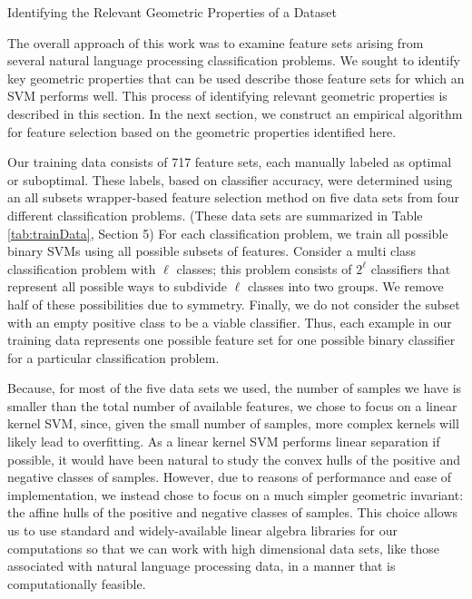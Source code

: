 \documentclass{llncs}
\begin{document}
\begin{section}{Identifying the Relevant Geometric Properties of a Dataset}

The overall approach of this work was to examine feature sets arising from  several natural language processing classification problems. We sought to identify key geometric properties that can be used describe those feature sets for which an SVM performs well. This process of identifying relevant geometric properties is described in this section. In the next section, we construct an empirical algorithm for feature selection based on the geometric properties identified here.

Our training data consists of 717 feature sets, each manually labeled as optimal or suboptimal. These labels, based on classifier accuracy, were determined using an all subsets wrapper-based feature selection method on five data sets from four different classification problems. (These data sets are summarized in Table \ref{tab:trainData}, Section 5) For each classification problem, we train all possible binary SVMs using all possible subsets of features. Consider a multi class classification problem with $\ell$ classes; this problem consists of $2^{\ell}$ classifiers that represent all possible ways to subdivide $\ell$ classes into two groups. We remove half of these possibilities due to symmetry. Finally, we do not consider the subset with an empty positive class to be a viable classifier. Thus, each example in our training data represents one possible feature set for one possible binary classifier for a particular classification problem.

Because, for most of the five data sets we used, the number of samples we have is smaller than the total number of available features, we chose to focus on a linear kernel SVM, since, given the small number of samples, more complex kernels will likely lead to overfitting. As a linear kernel SVM performs linear separation if possible, it would have been natural to study the convex hulls of the positive and negative classes of samples. However, due to reasons of performance and ease of implementation, we instead chose to focus on a much simpler geometric invariant: the affine hulls of the positive and negative classes of samples. This choice allows us to use standard and widely-available linear algebra libraries for our computations so that we can work with high dimensional data sets, like those associated with natural language processing data, in a manner that is computationally feasible.


\end{section}
\end{document}
